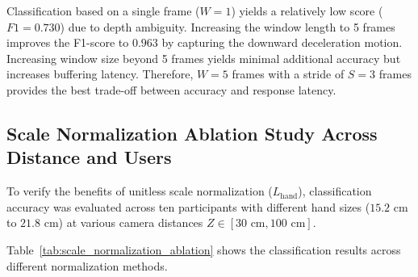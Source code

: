 \begin{table}[htbp]
\centering
\caption{Sensitivity analysis of temporal window length ($W$) and stride ($S$).}
\label{tab:window_length_sensitivity}
\end{table}

Classification based on a single frame ($W=1$) yields a relatively low score ($F1 = 0.730$) due to depth ambiguity. Increasing the window length to 5 frames improves the F1-score to $0.963$ by capturing the downward deceleration motion. Increasing window size beyond 5 frames yields minimal additional accuracy but increases buffering latency. Therefore, $W=5$ frames with a stride of $S=3$ frames provides the best trade-off between accuracy and response latency.

\subsection{Scale Normalization Ablation Study Across Distance and Users}
\label{subsec:test_scale_ablation}
To verify the benefits of unitless scale normalization ($L_{\text{hand}}$), classification accuracy was evaluated across ten participants with different hand sizes ($15.2\text{ cm}$ to $21.8\text{ cm}$) at various camera distances $Z \in [30\text{ cm}, 100\text{ cm}]$.

Table~\ref{tab:scale_normalization_ablation} shows the classification results across different normalization methods.

